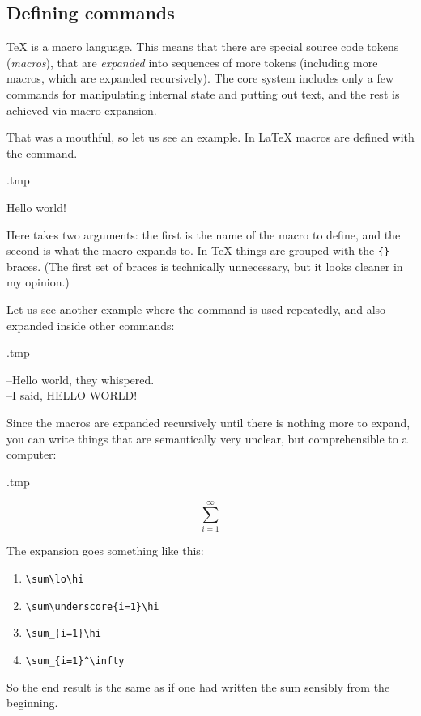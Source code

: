 \subsection{Defining commands}
\TeX{} is a macro language.
This means that there are special source code tokens (\emph{macros}),
that are \emph{expanded} into sequences of more tokens
(including more macros, which are expanded recursively).
The core system includes only a few commands for manipulating internal state and putting out text,
and the rest is achieved via macro expansion.

That was a mouthful, so let us see an example.
In \LaTeX{} macros are defined with the  command.

\begin{VerbatimOut}{\jobname.tmp}
\newcommand{\hello}{Hello world!}

\hello
\end{VerbatimOut}
\ShowExample

Here  takes two arguments:
the first is the name of the macro to define, and the second is what the macro expands to.
In \TeX{} things are grouped with the \verb|{}| braces.
(The first set of braces is technically unnecessary, but it looks cleaner in my opinion.)

Let us see another example where the command is used repeatedly,
and also expanded inside other commands:
\begin{VerbatimOut}{\jobname.tmp}
\newcommand{\hello}{Hello world}

--\hello, they whispered.\\
--I said, \MakeUppercase{\hello}!
\end{VerbatimOut}
\ShowExample

Since the macros are expanded recursively until there is nothing more to expand,
you can write things that are semantically very unclear,
but comprehensible to a computer:
\begin{VerbatimOut}{\jobname.tmp}
\newcommand{\hi}{^\infty}
\newcommand{\underscore}{_}
\newcommand{\lo}{\underscore{i=1}}

\[ \sum\lo\hi \]
\end{VerbatimOut}
\ShowExample
%
The expansion goes something like this:
\begin{enumerate}
    \item \verb|\sum\lo\hi|
    \item \verb|\sum\underscore{i=1}\hi|
    \item \verb|\sum_{i=1}\hi|
    \item \verb|\sum_{i=1}^\infty|
\end{enumerate}
So the end result is the same as if one had written the sum sensibly from the beginning.



